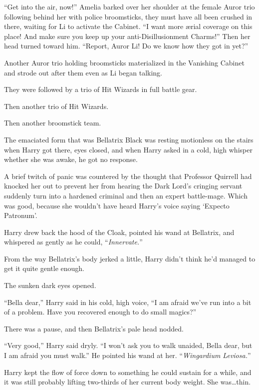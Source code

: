 “Get into the air, now!” Amelia barked over her shoulder at the female Auror trio following behind her with police broomsticks, they must have all been crushed in there, waiting for Li to activate the Cabinet. “I want more ærial coverage on this place! And make sure you keep up your anti-Disillusionment Charms!” Then her head turned toward him. “Report, Auror Li! Do we know how they got in yet?”

Another Auror trio holding broomsticks materialized in the Vanishing Cabinet and strode out after them even as Li began talking.

They were followed by a trio of Hit Wizards in full battle gear.

Then another trio of Hit Wizards.

Then another broomstick team.

\later

The emaciated form that was Bellatrix Black was resting motionless on the stairs when Harry got there, eyes closed, and when Harry asked in a cold, high whisper whether she was awake, he got no response.

A brief twitch of panic was countered by the thought that Professor Quirrell had knocked her out to prevent her from hearing the Dark Lord’s cringing servant suddenly turn into a hardened criminal and then an expert battle-mage. Which was good, because she wouldn’t have heard Harry’s voice saying ‘Expecto Patronum’.

Harry drew back the hood of the Cloak, pointed his wand at Bellatrix, and whispered as gently as he could, “\emph{Innervate.}”

From the way Bellatrix’s body jerked a little, Harry didn’t think he’d managed to get it quite gentle enough.

The sunken dark eyes opened.

“Bella dear,” Harry said in his cold, high voice, “I am afraid we’ve run into a bit of a problem. Have you recovered enough to do small magics?”

There was a pause, and then Bellatrix’s pale head nodded.

“Very good,” Harry said dryly. “I won’t ask you to walk unaided, Bella dear, but I am afraid you must walk.” He pointed his wand at her. “\emph{Wingardium Leviosa.}”

Harry kept the flow of force down to something he could sustain for a while, and it was still probably lifting two-thirds of her current body weight. She was…thin.


